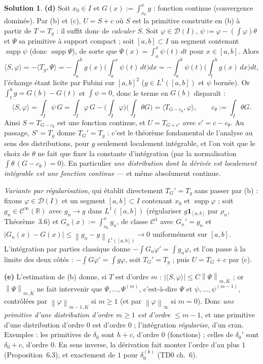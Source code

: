 \documentclass[11pt,a4paper]{article}
\newcommand{\R}{\mathbb{R}}
\newcommand{\norm}[1]{\left\|#1\right\|}
\newcommand{\Cinf}{\mathcal{C}^\infty}
\DeclareMathOperator{\supp}{supp}
\newcommand{\D}{\mathcal{D}}
\theoremstyle{definition}
\newtheorem*{solution}{Solution}
\begin{document}
\begin{solution}
\medskip
\noindent\textbf{(d)} Soit $x_0\in I$ et $G(x):=\int_{x_0}^xg$ : fonction continue (convergence dominée). Par (b) et (c), $U=S+c$ où $S$ est la primitive construite en (b) à partir de $T=T_g$ : il suffit donc de \emph{calculer $S$}. Soit $\varphi\in\D(I)$, $\psi:=\varphi-(\int\varphi)\theta$ et $\Psi$ sa primitive à support compact ; soit $[a,b]\subset I$ un segment contenant $\supp\psi$ (donc $\supp\Psi$), de sorte que $\Psi(x)=\int_a^x\psi(t)\,dt$ pour $x\in[a,b]$. Alors
\[
\langle S,\varphi\rangle=-\langle T_g,\Psi\rangle=-\int_a^bg(x)\Big(\int_a^x\psi(t)\,dt\Big)dx=-\int_a^b\psi(t)\Big(\int_t^bg(x)\,dx\Big)dt ,
\]
l'échange étant licite par Fubini sur $[a,b]^2$ ($g\in L^1([a,b])$ et $\psi$ bornée). Or $\int_t^bg=G(b)-G(t)$ et $\int\psi=0$, donc le terme en $G(b)$ disparaît :
\[
\langle S,\varphi\rangle=\int_I\psi\,G=\int_I\varphi\,G-\Big(\int_I\varphi\Big)\Big(\int_I\theta G\Big)=\langle T_{G-c_\theta},\varphi\rangle,\qquad c_\theta:=\int_I\theta G .
\]
Ainsi $S=T_{G-c_\theta}$ est une fonction continue, et $U=T_{G+c'}$ avec $c'=c-c_\theta$. Au passage, $S'=T_g$ donne $T_G'=T_g$ : c'est le théorème fondamental de l'analyse au sens des distributions, pour $g$ seulement localement intégrable, et l'on voit que le choix de $\theta$ ne fait que fixer la constante d'intégration (par la normalisation $\int\theta\,(G-c_\theta)=0$). En particulier \emph{une distribution dont la dérivée est localement intégrable est une fonction continue} — et même absolument continue.

\emph{Variante par régularisation}, qui établit directement $T_G'=T_g$ sans passer par (b) : fixons $\varphi\in\D(I)$ et un segment $[a,b]\subset I$ contenant $x_0$ et $\supp\varphi$ ; soit $g_n\in\Cinf(\R)$ avec $g_n\to g$ dans $L^1([a,b])$ (régulariser $g\mathbf 1_{[a,b]}$ par $\rho_n$, Théorème~3.6) et $G_n(x):=\int_{x_0}^xg_n$, de classe $\mathcal C^1$ avec $G_n'=g_n$ et $|G_n(x)-G(x)|\le\norm{g_n-g}_{L^1([a,b])}\to0$ uniformément sur $[a,b]$. L'intégration par parties classique donne $-\int G_n\varphi'=\int g_n\varphi$, et l'on passe à la limite des deux côtés : $-\int G\varphi'=\int g\varphi$, soit $T_G'=T_g$ ; puis $U=T_G+c$ par (c).

\medskip
\noindent\textbf{(e)} L'estimation de (b) donne, si $T$ est d'ordre $m$ : $|\langle S,\varphi\rangle|\le C\norm\Psi_{m,\tilde K}$ ; or $\norm\Psi_{m,\tilde K}$ ne fait intervenir que $\Psi,\dots,\Psi^{(m)}$, c'est-à-dire $\Psi$ et $\psi,\dots,\psi^{(m-1)}$, contrôlées par $\norm\varphi_{m-1,K}$ si $m\ge1$ (et par $\norm\varphi_\infty$ si $m=0$). Donc \emph{une primitive d'une distribution d'ordre $m\ge1$ est d'ordre $\le m-1$}, et une primitive d'une distribution d'ordre $0$ est d'ordre $0$ ; l'intégration \emph{régularise}, d'un cran. Exemples : les primitives de $\delta_0$ sont $h+c$, d'ordre $0$ (fonctions) ; celles de $\delta_0'$ sont $\delta_0+c$, d'ordre $0$. En sens inverse, la dérivation fait monter l'ordre d'au plus $1$ (Proposition~6.3), et exactement de $1$ pour $\delta_0^{(k)}$ (TD0 ch.~6).
\end{solution}
\end{document}
